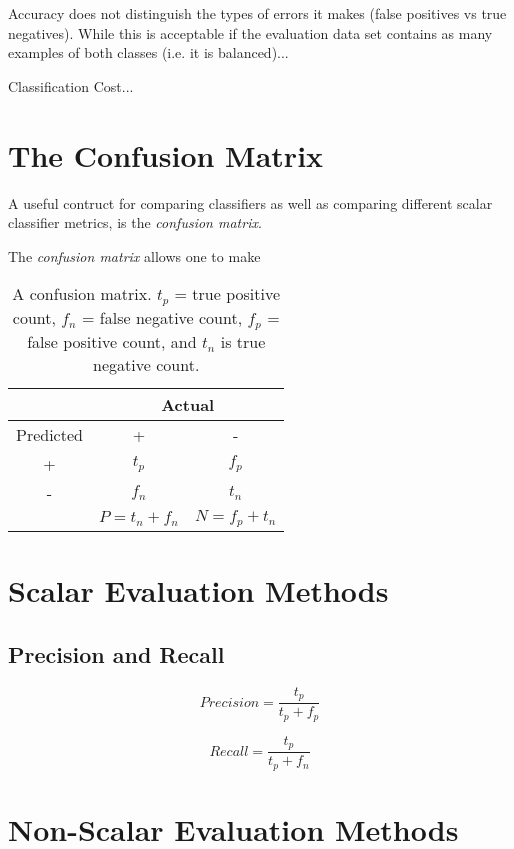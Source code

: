 \documentclass[10pt]{unbthesis}
\begin{document}
Accuracy does not distinguish the types of errors it makes (false
positives vs true negatives). While this is acceptable if the evaluation
data set contains as many examples of both classes (i.e. it is
balanced)...

Classification Cost...

\section*{The Confusion Matrix}
A useful contruct for comparing classifiers as well as comparing
different scalar classifier metrics, is the \textit{confusion
  matrix}. 

The \textit{confusion matrix} allows one to make 

\begin{table}
\centering
  \begin{tabular}{c|c|c|}
    & \multicolumn{2}{|c|}{Actual} \\ \hline
    Predicted & + & - \\ \hline
    + & \(t_p\)           & \(f_p\)          \\ \hline
    - & \(f_n\)           & \(t_n\)          \\ \hline
    & \(P = t_n + f_n\) & \(N = f_p + t_n\) \\ \cline{2-3}
  \end{tabular}
  \caption{A confusion matrix. \(t_p\) = true positive count, \(f_n\)
  = false negative count, \(f_p\) = false positive count, and \(t_n\)
  is true negative count.}
  \label{tab:commandline}
\end{table}


\section*{Scalar Evaluation Methods}


\subsection*{Precision and Recall}

\begin{equation}
\label{equ:precision}
Precision = \frac{t_p}{t_p + f_p}
\end{equation}


\begin{equation}
\label{equ:recall}
Recall = \frac{t_p}{t_p + f_n}
\end{equation}


\section*{Non-Scalar Evaluation Methods}
\end{document}
